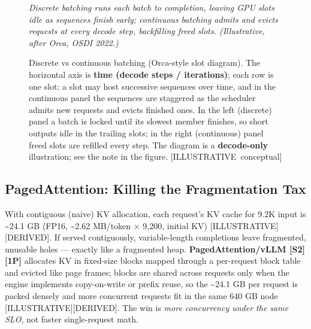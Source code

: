 \begin{figure}
\centering
{}
\caption[Discrete vs continuous batching (Orca-style slot diagram)]{Discrete vs continuous batching (Orca-style slot diagram). The horizontal axis is \textbf{time (decode steps / iterations)}; each row is one slot; a slot may host successive sequences over time, and in the continuous panel the sequences are staggered as the scheduler admits new requests and evicts finished ones. In the left (discrete) panel a batch is locked until its slowest member finishes, so short outputs idle in the trailing slots; in the right (continuous) panel freed slots are refilled every step. The diagram is a \textbf{decode-only} illustration; see the note in the figure. \mbox{{[}ILLUSTRATIVE conceptual{]}}}

\label{fig:11.1}\emph{Discrete batching runs each batch to completion, leaving GPU slots
idle as sequences finish early; continuous batching admits and evicts
requests at every decode step, backfilling freed slots. (Illustrative,
after Orca, OSDI 2022.)}

\end{figure}\subsection{PagedAttention: Killing the Fragmentation
Tax}\label{pagedattention-killing-the-fragmentation-tax}

With contiguous (naive) KV allocation, each request's KV cache for 9.2K
input is \textasciitilde24.1 GB (FP16, \textasciitilde2.62 MB/token ×
9,200, initial KV) \mbox{{[}ILLUSTRATIVE{]}}\hspace{0pt}\mbox{{[}DERIVED{]}}. If served
contiguously, variable-length completions leave fragmented, unusable
holes --- exactly like a fragmented heap. \textbf{PagedAttention/vLLM
\mbox{{[}S2{]}}\hspace{0pt}\mbox{{[}1P{]}}} allocates KV in fixed-size blocks mapped through a
per-request block table and evicted like page frames; blocks are shared
across requests only when the engine implements copy-on-write or prefix
reuse, so the \textasciitilde24.1 GB per request is packed densely and
more concurrent requests fit in the same 640 GB node
\mbox{{[}ILLUSTRATIVE{]}}\hspace{0pt}\mbox{{[}DERIVED{]}}. The win is \emph{more concurrency under
the same SLO}, not faster single-request math.

